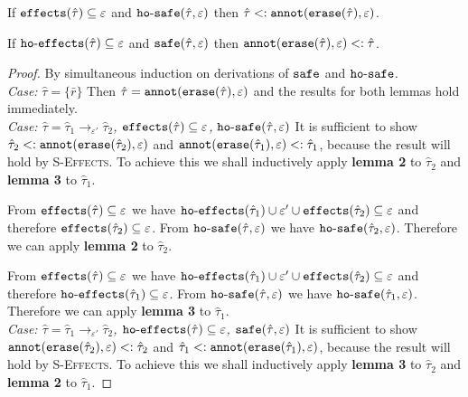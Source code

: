 \begin{appendix}
\hrulefill

\begin{lemma}
If $\mathtt{effects}(\hat \tau) \subseteq \varepsilon$ and $\mathtt{ho \hbox{-} safe}(\hat \tau, \varepsilon)$ then $\hat \tau <: \mathtt{annot}(\mathtt{erase}(\hat \tau), \varepsilon)$.
\end{lemma}

\begin{lemma}
If $\mathtt{ho \hbox{-} effects}(\hat \tau) \subseteq \varepsilon$ and $\mathtt{safe}(\hat \tau, \varepsilon)$ then $\mathtt{annot(erase}(\hat \tau), \varepsilon) <: \hat \tau$.
\end{lemma}

\begin{proof}
By simultaneous induction on derivations of $\mathtt{safe}$ and $\mathtt{ho \hbox{-} safe}$.\\

\textit{Case:} $\hat \tau = \{ \bar r \}$ Then $\hat \tau = \mathtt{annot(erase}(\hat \tau), \varepsilon)$ and the results for both lemmas hold immediately. \\

\textit{Case: $\hat \tau = \hat \tau_1 \rightarrow_{\varepsilon'} \hat \tau_2$, $\mathtt{effects}(\hat \tau) \subseteq \varepsilon$, $\mathtt{ho \hbox{-} safe}(\hat \tau, \varepsilon)$} It is sufficient to show $\hat \tau_2 <: \mathtt{annot(erase}(\hat \tau_2), \varepsilon)$ and $\mathtt{annot(erase}(\hat \tau_1), \varepsilon) <: \hat \tau_1$, because the result will hold by \textsc{S-Effects}. To achieve this we shall inductively apply \textbf{lemma 2} to $\hat \tau_2$ and \textbf{lemma 3} to $\hat \tau_1$. 

From $\mathtt{effects}(\hat \tau) \subseteq \varepsilon$ we have $\mathtt{ho \hbox{-} effects}(\hat \tau_1) \cup \varepsilon' \cup \mathtt{effects}(\hat \tau_2) \subseteq \varepsilon$ and therefore $\mathtt{effects}(\hat \tau_2) \subseteq \varepsilon$. From $\mathtt{ho \hbox{-} safe}(\hat \tau, \varepsilon)$ we have $\mathtt{ho \hbox{-} safe}(\hat \tau_2, \varepsilon)$. Therefore we can apply \textbf{lemma 2} to $\hat \tau_2$.

From $\mathtt{effects}(\hat \tau) \subseteq \varepsilon$ we have $\mathtt{ho \hbox{-} effects}(\hat \tau_1) \cup \varepsilon' \cup \mathtt{effects}(\hat \tau_2) \subseteq \varepsilon$ and therefore $\mathtt{ho \hbox{-} effects}(\hat \tau_1) \subseteq \varepsilon$. From $\mathtt{ho \hbox{-} safe}(\hat \tau, \varepsilon)$ we have $\mathtt{ho \hbox{-} safe}(\hat \tau_1, \varepsilon)$. Therefore we can apply \textbf{lemma 3} to $\hat \tau_1$.\\

\textit{Case: $\hat \tau = \hat \tau_1 \rightarrow_{\varepsilon'} \hat \tau_2$, $\mathtt{ho \hbox{-} effects}(\hat \tau) \subseteq \varepsilon$, $\mathtt{safe}(\hat \tau, \varepsilon)$ } It is sufficient to show $\mathtt{annot(erase}(\hat \tau_2), \varepsilon) <: \hat \tau_2$ and $\hat \tau_1 <: \mathtt{annot(erase}(\hat \tau_1), \varepsilon)$, because the result will hold by \textsc{S-Effects}. To achieve this we shall inductively apply \textbf{lemma 3} to $\hat \tau_2$ and \textbf{lemma 2} to $\hat \tau_1$.


\end{proof}
\end{appendix}
